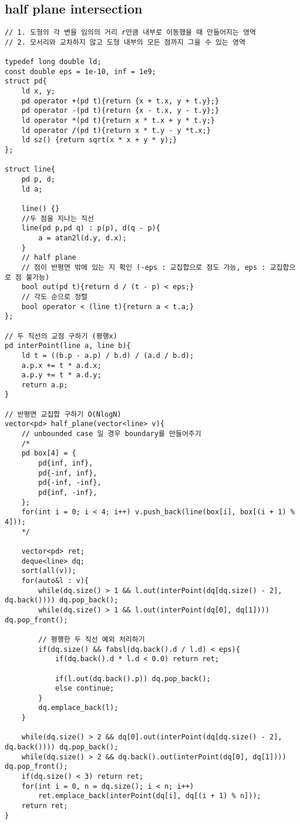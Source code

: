 \documentclass[landscape, 8pt, a4paper, oneside, twocolumn]{extarticle}
\begin{document}
\subsection{half plane intersection}
\begin{verbatim}
// 1. 도형의 각 변을 임의의 거리 r만큼 내부로 이동했을 때 만들어지는 영역
// 2. 모서리와 교차하지 않고 도형 내부의 모든 점까지 그을 수 있는 영역

typedef long double ld;
const double eps = 1e-10, inf = 1e9;
struct pd{
    ld x, y;
    pd operator +(pd t){return {x + t.x, y + t.y};}
    pd operator -(pd t){return {x - t.x, y - t.y};}
    ld operator *(pd t){return x * t.x + y * t.y;}
    ld operator /(pd t){return x * t.y - y *t.x;}
    ld sz() {return sqrt(x * x + y * y);}
};

struct line{
    pd p, d;
    ld a;
    
    line() {}
    //두 점을 지나는 직선
    line(pd p,pd q) : p(p), d(q - p){
        a = atan2l(d.y, d.x);
    }
    // half plane 
    // 점이 반평면 밖에 있는 지 확인 (-eps : 교집합으로 점도 가능, eps : 교집합으로 점 불가능)
    bool out(pd t){return d / (t - p) < eps;}
    // 각도 순으로 정렬
    bool operator < (line t){return a < t.a;}
};

// 두 직선의 교점 구하기 (평행x)
pd interPoint(line a, line b){
    ld t = ((b.p - a.p) / b.d) / (a.d / b.d);
    a.p.x += t * a.d.x;
    a.p.y += t * a.d.y;
    return a.p;
}

// 반평면 교집합 구하기 O(NlogN)
vector<pd> half_plane(vector<line> v){
    // unbounded case 일 경우 boundary를 만들어주기
    /* 
    pd box[4] = {
        pd{inf, inf},
        pd{-inf, inf},
        pd{-inf, -inf},
        pd{inf, -inf},
    };
    for(int i = 0; i < 4; i++) v.push_back(line(box[i], box[(i + 1) % 4]));
    */

    vector<pd> ret;
    deque<line> dq;
    sort(all(v));
    for(auto&l : v){
        while(dq.size() > 1 && l.out(interPoint(dq[dq.size() - 2], dq.back()))) dq.pop_back();
        while(dq.size() > 1 && l.out(interPoint(dq[0], dq[1]))) dq.pop_front();

        // 평행한 두 직선 예외 처리하기
        if(dq.size() && fabsl(dq.back().d / l.d) < eps){
            if(dq.back().d * l.d < 0.0) return ret;
            
            if(l.out(dq.back().p)) dq.pop_back();
            else continue;
        }
        dq.emplace_back(l);
    }

    while(dq.size() > 2 && dq[0].out(interPoint(dq[dq.size() - 2], dq.back()))) dq.pop_back();
    while(dq.size() > 2 && dq.back().out(interPoint(dq[0], dq[1]))) dq.pop_front();
    if(dq.size() < 3) return ret;
    for(int i = 0, n = dq.size(); i < n; i++)
        ret.emplace_back(interPoint(dq[i], dq[(i + 1) % n]));
    return ret;
}
\end{verbatim}
\end{document}
